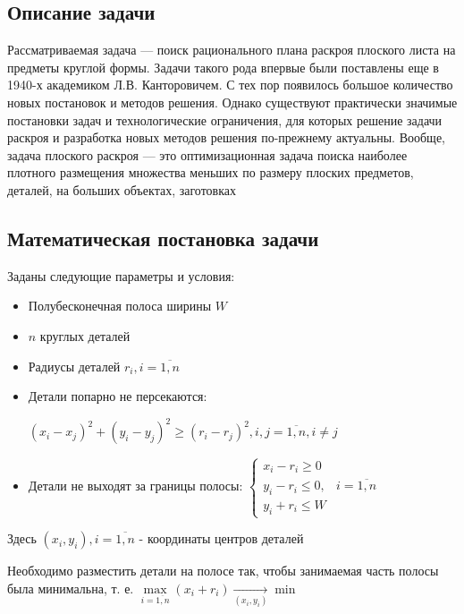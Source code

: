 \subsection{Описание задачи}
Рассматриваемая задача — поиск рационального плана раскроя плоского листа на предметы круглой формы. Задачи такого рода впервые
были поставлены еще в 1940-х академиком Л.В. Канторовичем. С тех пор появилось большое количество новых постановок и методов решения. Однако существуют практически значимые 
постановки задач и технологические ограничения, для которых решение задачи раскроя и
разработка новых методов решения по-прежнему актуальны.
Вообще, задача плоского раскроя — это оптимизационная задача поиска наиболее плотного размещения множества меньших по размеру 
плоских предметов, деталей, на больших объектах, заготовках

\subsection{Математическая постановка задачи}
Заданы следующие параметры и условия:
\begin{itemize}
\item Полубесконечная полоса ширины $W$ 
\item $n$ круглых деталей
\item Радиусы деталей  $r_{i}, i = \overline{1, n}$
\item Детали попарно не персекаются:

$(x_{i} - x_{j})^{2} + (y_{i} - y_{j})^{2} \ge (r_{i} - r_{j})^{2}, i, j = \overline{1, n}, i \neq j$
\item Детали не выходят за границы полосы: 
$%
\begin{cases}
	x_{i} - r_{i} \ge 0 \\
	y_{i} - r_{i} \le 0,	& i = \overline{1, n} \\
	y_{i} + r_{i} \le W
\end{cases}
$%
\end{itemize}

Здесь ${(x_{i}, y_{i}),   i = \overline{1, n}}$ - координаты центров деталей

Необходимо разместить детали на полосе так, чтобы занимаемая часть полосы была минимальна, т. е. ${\max\limits_{i = \overline{1, n}}(x_{i} + r_{i})\xrightarrow[{(x_i, y_i)}]{} \min}$
\printbibliography

